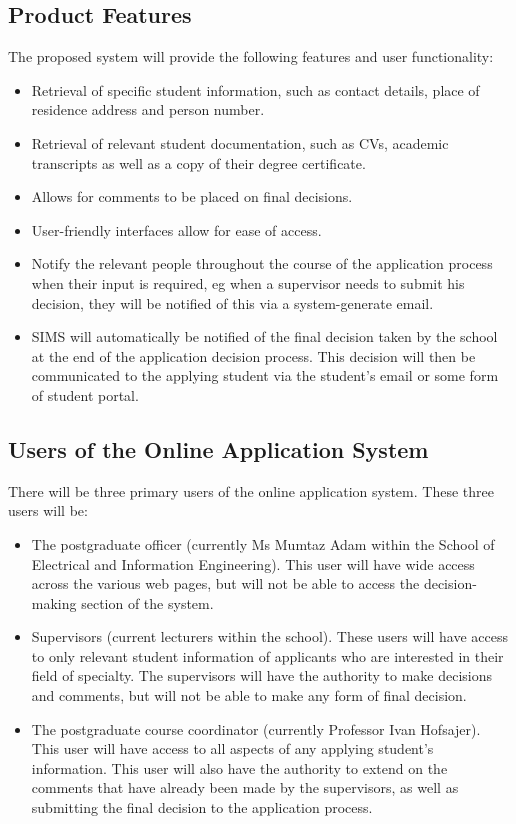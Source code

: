 \documentclass[journal,comsoc,onecolumn]{IEEEtran}
\begin{document}
\subsection{Product Features}
The proposed system will provide the following features and user functionality:

\begin{itemize} 
\item Retrieval of specific student information, such as contact details, place of residence address and person number.
\item Retrieval of relevant student documentation, such as CVs, academic transcripts as well as a copy of their degree certificate.
\item Allows for comments to be placed on final decisions.
\item User-friendly interfaces allow for ease of access.
\item Notify the relevant people throughout the course of the application process when their input is required, eg when a supervisor needs to submit his decision, they will be notified of this via a system-generate email.
\item SIMS will automatically be notified of the final decision taken by the school at the end of the application decision process. This decision will then be communicated to the applying student via the student's email or some form  of student portal.
\end{itemize}

\subsection{Users of the Online Application System}
There will be three primary users of the online application system. These three users will be:

\begin{itemize}
\item The postgraduate officer (currently Ms Mumtaz Adam within the School of Electrical and Information Engineering). This user will have wide access across the various web pages, but will not be able to access the decision-making section of the system.
\item Supervisors (current lecturers within the school). These users will have access to only relevant student information of applicants who are interested in their field of specialty. The supervisors will have the authority to make decisions and comments, but will not be able to make any form of final decision.
\item The postgraduate course coordinator (currently Professor Ivan Hofsajer). This user will have access to all aspects of any applying student's information. This user will also have the authority to extend on the comments that have already been made by the supervisors, as well as submitting the final decision to the application process.
\end{itemize}
\end{document}
